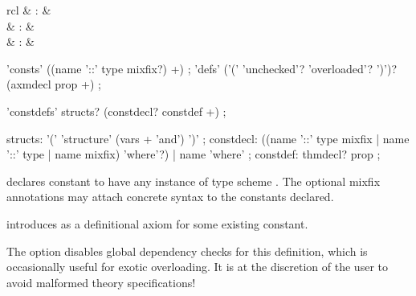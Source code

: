 \begin{isabellebody}
\begin{isamarkuptext}
  \begin{matharray}{rcl}
    \hypertarget{command.consts}{\hyperlink{command.consts}{\mbox{}}} & : &  \\
    \hypertarget{command.defs}{\hyperlink{command.defs}{\mbox{}}} & : &  \\
    \hypertarget{command.constdefs}{\hyperlink{command.constdefs}{\mbox{}}} & : &  \\
  \end{matharray}

  \begin{rail}
    'consts' ((name '::' type mixfix?) +)
    ;
    'defs' ('(' 'unchecked'? 'overloaded'? ')')? \\ (axmdecl prop +)
    ;
  \end{rail}

  \begin{rail}
    'constdefs' structs? (constdecl? constdef +)
    ;

    structs: '(' 'structure' (vars + 'and') ')'
    ;
    constdecl:  ((name '::' type mixfix | name '::' type | name mixfix) 'where'?) | name 'where'
    ;
    constdef: thmdecl? prop
    ;
  \end{rail}

  \begin{descr}

  \item [\hyperlink{command.consts}{\mbox{\isa{\isacommand{consts}}}}~\isa{{\isachardoublequote}c\ {\isacharcolon}{\isacharcolon}\ {\isasymsigma}{\isachardoublequote}}] declares constant
   to have any instance of type scheme \isa{{\isasymsigma}}.  The
  optional mixfix annotations may attach concrete syntax to the
  constants declared.
  
  \item [\hyperlink{command.defs}{\mbox{\isa{\isacommand{defs}}}}~\isa{{\isachardoublequote}name{\isacharcolon}\ eqn{\isachardoublequote}}] introduces 
  as a definitional axiom for some existing constant.
  
  The  option disables global dependency checks
  for this definition, which is occasionally useful for exotic
  overloading.  It is at the discretion of the user to avoid malformed
  theory specifications!
  

\end{descr}
\end{isamarkuptext}
\end{isabellebody}
